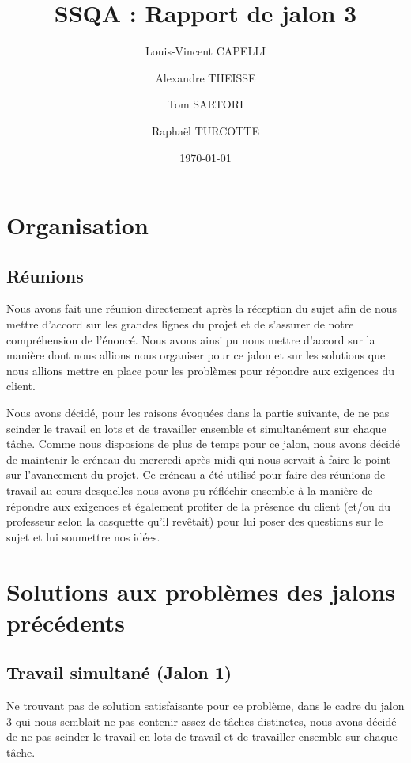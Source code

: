 \documentclass{report}
\begin{document}
\title{SSQA : Rapport de jalon 3}

\author{Louis-Vincent CAPELLI \and Alexandre THEISSE \and Tom SARTORI \and Raphaël TURCOTTE}
\date{\today}
\maketitle

\chapter{Organisation}
\section{Réunions}
Nous avons fait une réunion directement après la réception du sujet afin de nous mettre
d'accord sur les grandes lignes du projet et de s'assurer de notre compréhension de l'énoncé.
Nous avons ainsi pu nous mettre d'accord sur la manière dont nous allions nous organiser
pour ce jalon et sur les solutions que nous allions mettre en place pour les problèmes pour
répondre aux exigences du client.

Nous avons décidé, pour les raisons évoquées dans la partie suivante, de ne pas scinder
le travail en lots et de travailler ensemble et simultanément sur chaque tâche.
Comme nous disposions de plus de temps pour ce jalon, nous avons décidé de maintenir le
créneau du mercredi après-midi qui nous servait à faire le point sur l'avancement du projet.
Ce créneau a été utilisé pour faire des réunions de travail au cours desquelles nous avons
pu réfléchir ensemble à la manière de répondre aux exigences et également profiter de la
présence du client (et/ou du professeur selon la casquette qu'il revêtait) pour lui poser des
questions sur le sujet et lui soumettre nos idées.


\chapter{Solutions aux problèmes des jalons précédents}

\section{Travail simultané (Jalon 1)}
Ne trouvant pas de solution satisfaisante pour ce problème, dans le cadre du jalon 3 qui
nous semblait ne pas contenir assez de tâches distinctes, nous avons décidé de ne pas scinder
le travail en lots de travail et de travailler ensemble sur chaque tâche.
\end{document}

